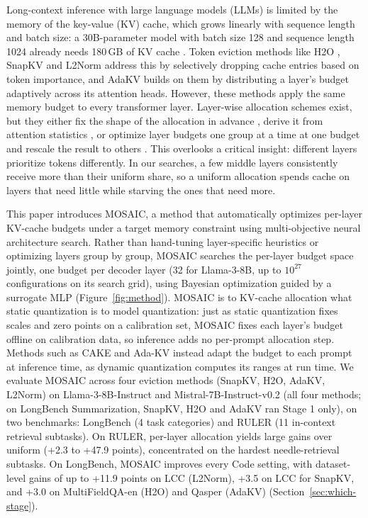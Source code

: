 \documentclass[11pt]{article}
\begin{document}
Long-context inference with large language models (LLMs) is limited by the memory of the key-value (KV) cache, which grows linearly with sequence length and batch size: a 30B-parameter model with batch size 128 and sequence length 1024 already needs 180\,GB of KV cache \citep{zhang2023h2o}. Token eviction methods like H2O \citep{zhang2023h2o}, SnapKV \citep{li2024snapkv} and L2Norm \citep{devoto2024l2norm} address this by selectively dropping cache entries based on token importance, and AdaKV \citep{feng2025adakv} builds on them by distributing a layer's budget adaptively across its attention heads. However, these methods apply the same memory budget to every transformer layer. Layer-wise allocation schemes exist, but they either fix the shape of the allocation in advance \citep{cai2025pyramidkv}, derive it from attention statistics \citep{qin2025cake}, or optimize layer budgets one group at a time at one budget and rescale the result to others \citep{yu2025evolkv}. This overlooks a critical insight: different layers prioritize tokens differently. In our searches, a few middle layers consistently receive more than their uniform share, so a uniform allocation spends cache on layers that need little while starving the ones that need more.

This paper introduces MOSAIC, a method that automatically optimizes per-layer KV-cache budgets under a target memory constraint using multi-objective neural architecture search. Rather than hand-tuning layer-specific heuristics or optimizing layers group by group, MOSAIC searches the per-layer budget space jointly, one budget per decoder layer (32 for Llama-3-8B, up to $10^{27}$ configurations on its search grid), using Bayesian optimization guided by a surrogate MLP (Figure~\ref{fig:method}). MOSAIC is to KV-cache allocation what static quantization is to model quantization: just as static quantization fixes scales and zero points on a calibration set, MOSAIC fixes each layer's budget offline on calibration data, so inference adds no per-prompt allocation step. Methods such as CAKE and Ada-KV instead adapt the budget to each prompt at inference time, as dynamic quantization computes its ranges at run time. We evaluate MOSAIC across four eviction methods (SnapKV, H2O, AdaKV, L2Norm) on Llama-3-8B-Instruct and Mistral-7B-Instruct-v0.2 (all four methods; on LongBench Summarization, SnapKV, H2O and AdaKV ran Stage 1 only), on two benchmarks: LongBench (4 task categories) and RULER (11 in-context retrieval subtasks). On RULER, per-layer allocation yields large gains over uniform (+2.3 to +47.9 points), concentrated on the hardest needle-retrieval subtasks. On LongBench, MOSAIC improves every Code setting, with dataset-level gains of up to +11.9 points on LCC (L2Norm), +3.5 on LCC for SnapKV, and +3.0 on MultiFieldQA-en (H2O) and Qasper (AdaKV) (Section~\ref{sec:which-stage}).
\end{document}
